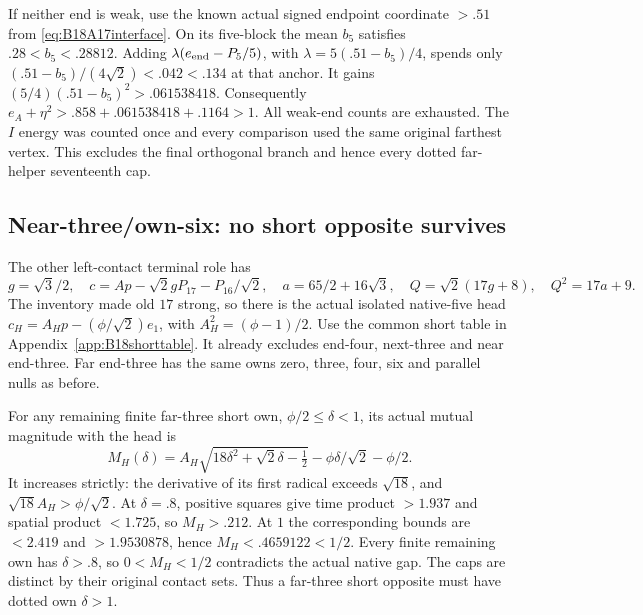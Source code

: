 \documentclass[11pt]{article}
\theoremstyle{definition}
\theoremstyle{remark}
\begin{document}
If neither end is weak, use the known actual signed endpoint
coordinate \(>.51\) from \eqref{eq:B18A17interface}.
On its five-block the mean \(b_5\) satisfies \(.28<b_5<.28812\).
Adding \(\lambda(e_{\rm end}-P_5/5)\), with
\(\lambda=5(.51-b_5)/4\), spends only
\((.51-b_5)/(4\sqrt2)<.042<.134\) at that anchor.
It gains \((5/4)(.51-b_5)^2>.061538418\).
Consequently \(e_A+\eta^2>.858+.061538418+.1164>1\).
All weak-end counts are exhausted. The \(I\) energy was counted once
and every comparison used the same original farthest vertex.
This excludes the final orthogonal branch and hence every dotted
far-helper seventeenth cap.

\subsection{Near-three/own-six: no short opposite survives}
\label{app:B18near6}
The other left-contact terminal role has
\[
 g=\sqrt3/2,\quad
 c=Ap-\sqrt2gP_{17}-P_{16}/\sqrt2,\quad
 a=65/2+16\sqrt3,\quad Q=\sqrt2(17g+8),\quad Q^2=17a+9 .
\]
The inventory made old \(17\) strong, so there is the actual
isolated native-five head
\(c_H=A_Hp-(\phi/\sqrt2)e_1\), with
\(A_H^2=(\phi-1)/2\).
Use the common short table in Appendix~\ref{app:B18shorttable}.
It already excludes end-four, next-three and near end-three.
Far end-three has the same owns zero, three, four, six and parallel
nulls as before.

For any remaining finite far-three short own,
\(\phi/2\leq\delta<1\), its actual mutual magnitude with the head is
\[
 M_H(\delta)=A_H\sqrt{18\delta^2+\sqrt2\delta-\tfrac12}
             -\phi\delta/\sqrt2-\phi/2 .
\]
It increases strictly: the derivative of its first radical exceeds
\(\sqrt{18}\), and \(\sqrt{18}A_H>\phi/\sqrt2\).
At \(\delta=.8\), positive squares give time product \(>1.937\)
and spatial product \(<1.725\), so \(M_H>.212\).
At \(1\) the corresponding bounds are \(<2.419\) and
\(>1.9530878\), hence \(M_H<.4659122<1/2\).
Every finite remaining own has \(\delta>.8\), so
\(0<M_H<1/2\) contradicts the actual native gap.
The caps are distinct by their original contact sets.
Thus a far-three short opposite must have dotted own \(\delta>1\).
\end{document}
